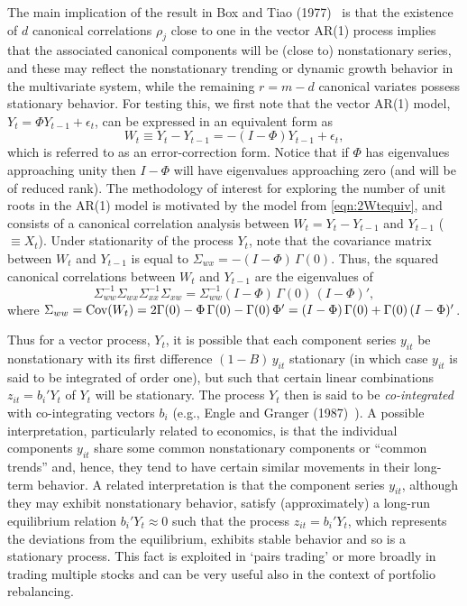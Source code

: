 The main implication of the result in Box and Tiao (1977)~\cite{box77} is that the existence of $d$ canonical correlations $\rho_j$ close to one in the vector AR(1) process implies that the associated canonical components will be (close to) nonstationary series, and these may reflect the nonstationary trending or dynamic growth behavior in the multivariate system, while the remaining $r= m - d$ canonical variates possess stationary behavior. For testing this, we first note that the vector AR(1) model, $Y_t = \Phi Y_{t-1} + \epsilon_t$, can be expressed in an equivalent form as
	\begin{equation} \label{eqn:2Wtequiv}
	W_t \equiv Y_t - Y_{t-1} = - (I - \Phi ) Y_{t-1} + \epsilon_t, 
	\end{equation}
which is referred to as an error-correction form.  Notice that if $\Phi$ has eigenvalues approaching unity then $I - \Phi$ will have eigenvalues approaching zero (and will be of reduced rank).  The methodology of interest for exploring the number of unit roots in the AR(1) model is motivated by the model from \eqref{eqn:2Wtequiv}, and consists of a canonical correlation analysis between $W_t = Y_t - Y_{t-1}$ and $Y_{t-1}$ ($\equiv X_t$).  Under stationarity of the process $Y_t$, note that the covariance matrix between $W_t$ and $Y_{t-1}$ is equal to $\Sigma_{wx} = - (I - \Phi )\, \Gamma(0)$.  Thus, the squared canonical correlations between $W_t$ and $Y_{t-1}$ are the eigenvalues of
	\begin{equation} \label{eqn:2doublesigma}
	\Sigma_{ww}^{-1} \Sigma_{wx} \Sigma_{xx}^{-1} \Sigma_{xw}= \Sigma_{ww}^{-1} ( I - \Phi )\, \Gamma(0) \,(I  - \Phi )', 
	\end{equation}
where $\Sigma_{ww} = \operatorname{Cov}(W_t) = 2 \Gamma(0) - \Phi\, \Gamma (0) - \Gamma(0)\, \Phi' = (I - \Phi )\, \Gamma (0) + \Gamma(0) \,( I - \Phi)'$. \twomedskip


Thus for a vector process, $Y_t$, it is possible that each component series $y_{it}$ be nonstationary with its first difference $(1 - B)\, y_{it}$ stationary (in which case $y_{it}$ is said to be integrated of order one), but such that certain linear combinations $z_{it} = b_i' Y_t $ of $Y_t$ will be stationary. The process $Y_t$ then is said to be \emph{co-integrated} with co-integrating vectors $b_i$ (e.g., Engle and Granger (1987)~\cite{engle1987co}).  A possible interpretation, particularly related to economics, is that the individual components $y_{it}$ share some common nonstationary components or ``common trends'' and, hence, they tend to have certain similar movements in their long-term behavior.  A related interpretation is that the component series $y_{it}$, although they may exhibit nonstationary behavior, satisfy (approximately) a long-run equilibrium relation $b_i' Y_t \approx 0$ such that the process $z_{it} = b_i' Y_t$, which represents the deviations from the equilibrium, exhibits stable behavior and so is a stationary process. This fact is exploited in `pairs trading' or more broadly in trading multiple stocks and can be very useful also in the context of portfolio rebalancing. 


